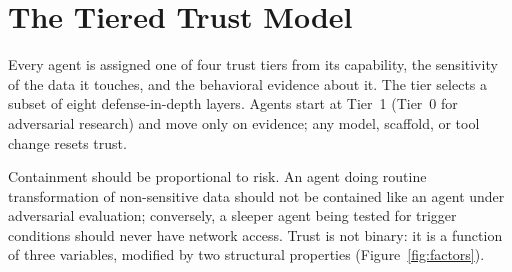 \documentclass[11pt,letterpaper]{article}
\begin{document}
\section{The Tiered Trust Model}
\label{sec:tiers}

\begin{glance}
Every agent is assigned one of four trust tiers from its capability, the sensitivity of the data it touches, and the behavioral evidence about it. The tier selects a subset of eight defense-in-depth layers. Agents start at Tier~1 (Tier~0 for adversarial research) and move only on evidence; any model, scaffold, or tool change resets trust.
\end{glance}

Containment should be proportional to risk. An agent doing routine transformation of non-sensitive data should not be contained like an agent under adversarial evaluation; conversely, a sleeper agent being tested for trigger conditions should never have network access. Trust is not binary: it is a function of three variables, modified by two structural properties (Figure~\ref{fig:factors}).
\end{document}
